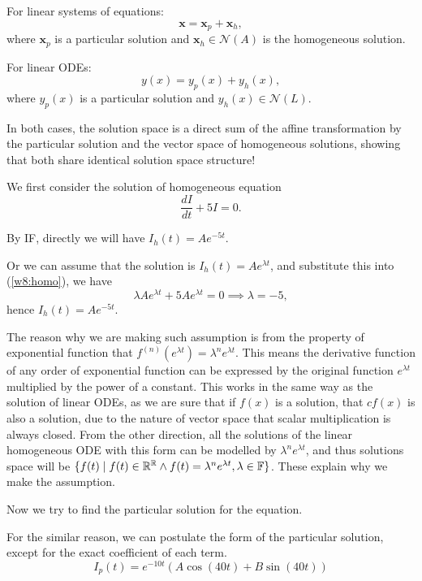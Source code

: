 \documentclass[12pt,a4paper]{article}
\begin{document}
\begin{remark}
For linear systems of equations:
\[
\mathbf{x} = \mathbf{x}_p + \mathbf{x}_h,
\]
where \( \mathbf{x}_p \) is a particular solution and \( \mathbf{x}_h \in \mathcal{N}(A) \) is the homogeneous solution.

For linear ODEs:
\[
y(x) = y_p(x) + y_h(x),
\]
where \( y_p(x) \) is a particular solution and \( y_h(x) \in \mathcal{N}(L) \).

In both cases, the solution space is a direct sum of the affine transformation by the particular solution and the vector space of homogeneous solutions, showing that both share identical solution space structure!
\end{remark}
We first consider the solution of homogeneous equation
\[
    \frac{dI}{dt} +5I= 0.
\]

By IF, directly we will have $I_h(t) = Ae^{-5t}$.

Or we can assume that the solution is $I_h(t)=A e^{\lambda t}$, and substitute this into (\ref{w8:homo}), we have 
\[
\lambda A e^{\lambda t}+5Ae^{\lambda t}=0\implies \lambda = -5,
\]
hence $I_h(t) = Ae^{-5t}$.
\begin{remark}
    The reason why we are making such assumption is from the property of exponential function that
$f^{(n)}(e^{\lambda t}) = \lambda^n e^{\lambda t}$. This means the derivative function of any order of exponential function can be expressed by the original function $e^{\lambda t}$ multiplied by the power of a constant. This works in the same way as the solution of linear ODEs, as we are sure that if $f(x)$ is a solution, that $cf(x)$ is also a solution, due to the nature of vector space that scalar multiplication is always closed. From the other direction, all the solutions of the linear homogeneous ODE with this form can be modelled by $\lambda^n e^{\lambda t}$, and thus solutions space will be $\{f(t)\mid f(t)\in \mathbb{R}^{\mathbb{R}} \land f(t) = \lambda^n e^{\lambda t}, \lambda \in \mathbb{F}\}$. These explain why we make the assumption.
\end{remark}
Now we try to find the particular solution for the equation.

For the similar reason, we can postulate the form of the particular solution, except for the exact coefficient of each term.
\begin{equation}\label{w8:muv}
    I_p(t)=e^{-10 t}(A \cos (40 t)+B \sin (40 t))
\end{equation}
\end{document}
